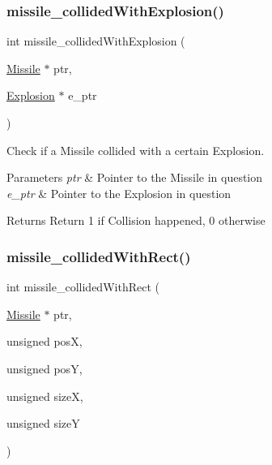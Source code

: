 \subsubsection{\texorpdfstring{missile\+\_\+collided\+With\+Explosion()}{missile\_collidedWithExplosion()}}
{\footnotesize\ttfamily int missile\+\_\+collided\+With\+Explosion (\begin{DoxyParamCaption}\item[{\hyperlink{group___missile_ga7ea98f7c879356e5dfa41934529d86e1}{Missile} $\ast$}]{ptr,  }\item[{\hyperlink{group___missile_gab15157e0eccd9297f66644015d4966b1}{Explosion} $\ast$}]{e\+\_\+ptr }\end{DoxyParamCaption})}



Check if a Missile collided with a certain Explosion. 


\begin{DoxyParams}{Parameters}
{\em ptr} & Pointer to the Missile in question \\
\hline
{\em e\+\_\+ptr} & Pointer to the Explosion in question\\
\hline
\end{DoxyParams}
\begin{DoxyReturn}{Returns}
Return 1 if Collision happened, 0 otherwise 
\end{DoxyReturn}
\hypertarget{group___missile_gacc30474e7e5f9cf52f0b41dcc27aa231}{}\label{group___missile_gacc30474e7e5f9cf52f0b41dcc27aa231} 
\subsubsection{\texorpdfstring{missile\+\_\+collided\+With\+Rect()}{missile\_collidedWithRect()}}
{\footnotesize\ttfamily int missile\+\_\+collided\+With\+Rect (\begin{DoxyParamCaption}\item[{\hyperlink{group___missile_ga7ea98f7c879356e5dfa41934529d86e1}{Missile} $\ast$}]{ptr,  }\item[{unsigned}]{posX,  }\item[{unsigned}]{posY,  }\item[{unsigned}]{sizeX,  }\item[{unsigned}]{sizeY }\end{DoxyParamCaption})}



